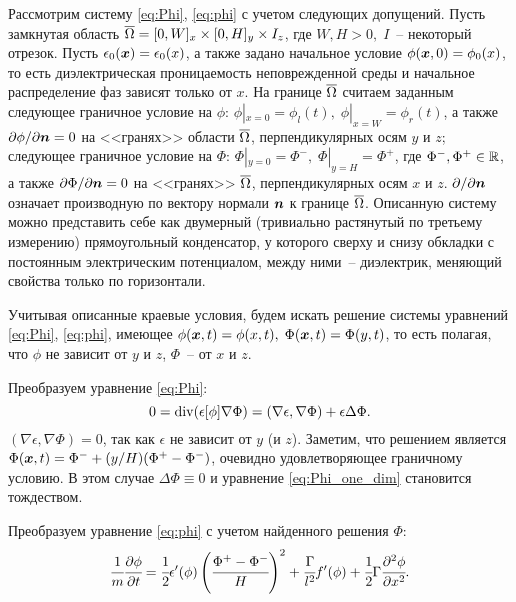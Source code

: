 Рассмотрим систему \eqref{eq:Phi}, \eqref{eq:phi} с учетом следующих допущений. Пусть замкнутая область ${\overline{\Omega}} = [0, W]_x \times [0, H]_y \times I_z$, где $W, H > 0, \; I$~-- некоторый отрезок. Пусть $\epsilon_0({\boldsymbol{x}}) = \epsilon_0(x)$, а также задано начальное условие $\phi({\boldsymbol{x}}, 0) = \phi_0(x)$, то есть диэлектрическая проницаемость неповрежденной среды и начальное распределение фаз зависят только от $x$. На границе ${\overline{\Omega}}$ считаем заданным следующее граничное условие на $\phi$: $\phi|_{x = 0} = \phi_l(t), \; \phi|_{x = W} = \phi_r(t)$, а также $\partial \phi / \partial {\boldsymbol{n}}= 0$ на <<гранях>> области ${\overline{\Omega}}$, перпендикулярных осям $y$ и $z$; следующее граничное условие на $\Phi$: $\Phi|_{y = 0} = \Phi^-, \; \Phi|_{y = H} = \Phi^+$, где $\Phi^-, \Phi^+ \in {\mathbb{R}}$, а также $\partial \Phi / \partial {\boldsymbol{n}} = 0$ на <<гранях>> ${\overline{\Omega}}$, перпендикулярных осям $x$ и $z$. $\partial  / \partial {\boldsymbol{n}}$ означает производную по вектору нормали ${\boldsymbol{n}}$ к границе ${\overline{\Omega}}$. Описанную систему можно представить себе как двумерный (тривиально растянутый по третьему измерению) прямоугольный конденсатор, у которого сверху и снизу обкладки с постоянным электрическим потенциалом, между ними~-- диэлектрик, меняющий свойства только по горизонтали.

Учитывая описанные краевые условия, будем искать решение системы уравнений \eqref{eq:Phi}, \eqref{eq:phi}, имеющее $\phi({\boldsymbol{x}}, t) = \phi(x, t), \; \Phi({\boldsymbol{x}}, t) = \Phi(y, t)$, то есть полагая, что $\phi$ не зависит от $y$ и $z$, $\Phi$~-- от $x$ и $z$.

Преобразуем уравнение \eqref{eq:Phi}:
\begin{equation}
	0 = \operatorname{{div}}(\epsilon[\phi] \nabla \Phi) = (\nabla \epsilon, \nabla \Phi) + \epsilon \Delta \Phi {\text{.}}
	\label{eq:Phi_one_dim}
\end{equation}
$(\nabla \epsilon, \nabla \Phi) = 0$, так как $\epsilon$ не зависит от $y$ (и $z$). Заметим, что решением является $\Phi({\boldsymbol{x}}, t) = \Phi^- + (y / H)(\Phi^+ - \Phi^-)$, очевидно удовлетворяющее граничному условию. В этом случае $\Delta \Phi \equiv 0$ и уравнение \eqref{eq:Phi_one_dim} становится тождеством.

Преобразуем уравнение \eqref{eq:phi} с учетом найденного решения $\Phi$:
\begin{equation}
	\cfrac{1}{m} \cfrac{\partial \phi}{\partial t} = \cfrac{1}{2} \epsilon'(\phi) \left( \cfrac{\Phi^+ - \Phi^-}{H} \right)^2 + \cfrac{\Gamma}{l^2} f'(\phi) + \cfrac{1}{2} \Gamma \cfrac{\partial^2 \phi}{\partial x^2} {\text{.}}
	\label{eq:one_dim_preparation}
\end{equation}

